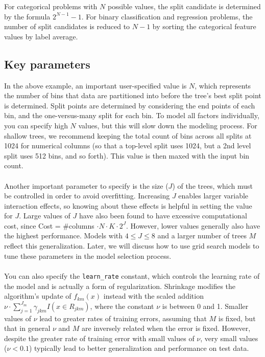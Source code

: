 For categorical problems with $N$ possible values, the split candidate is determined by the formula $2^{N-1}-1$.
For binary classification and regression problems, the number of split candidates is reduced to $N-1$ by sorting
the categorical feature values by label average.

\subsection{Key parameters}

In the above example, an important user-specified value is $N$, which represents the number of bins that data are
partitioned into before the tree's best split point is determined. Split points are determined by considering the
end points of each bin, and the one-versus-many split for each bin. To model all factors individually, you can
specify high $N$ values, but this will slow down the modeling process. For shallow trees, we recommend keeping the
total count of bins across all splits at 1024  for numerical columns (so that a top-level split uses 1024, but a 2nd level split uses 512
bins, and so forth). This value is then maxed with the input bin count.
\\
\\
Another important parameter to specify is the size ($J$) of the trees, which must be controlled in order to avoid
overfitting. Increasing $J$ enables larger variable interaction effects, so knowing about these effects is helpful
in setting the value for $J$. Large values of $J$ have also been found to have excessive computational cost,
since Cost = \#columns $\cdot N \cdot K \cdot 2^{J}$. However, lower values generally also have the highest
performance. Models with $4 \leq J \leq 8$ and a larger number of trees $M$ reflect this generalization.
Later, we will discuss how to use grid search models to tune these parameters in the model selection process.
\\
\\
You can also specify the \texttt{learn\_rate} constant, which controls the learning rate of the model and is actually a
form of regularization. Shrinkage modifies the algorithm's update of $f_{km}(x)$ instead with the scaled
addition $\nu \cdot \sum_{j=1}^{J_m} \gamma_{jkm} I(x \in R_{jkm})$, where the constant $\nu$ is between 0 and 1.
Smaller values of $\nu$ lead to greater rates of training errors, assuming that $M$ is fixed, but that in general
$\nu$ and $M$ are inversely related when the error is  fixed.
However, despite the greater rate of training error with small values of $\nu$, very small values ($\nu < 0.1$)
typically lead to better generalization and performance on test data.

